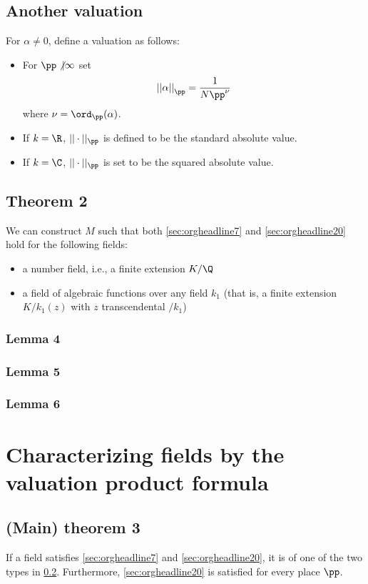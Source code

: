 \documentclass{article}
\begin{document}
\subsection{Another valuation}
\label{sec:orgheadline21}
For \(\alpha\neq 0\), define a valuation as follows:
\begin{itemize}
\item For \(\pp \not | \infty\) set
\[ { ||\alpha|| }_\pp = \frac1{ N\pp^\nu } \]
where \(\nu = \ord_\pp(\alpha)\).
\item If \(k=\R\), \(||\cdot||_\pp\) is defined to be the standard absolute value.
\item If \(k=\C\), \(||\cdot||_\pp\) is set to be the squared absolute value.
\end{itemize}
\subsection{Theorem 2}
\label{sec:orgheadline25}
We can construct \(M\) such that both \ref{sec:orgheadline7} and \ref{sec:orgheadline20} hold for the following fields:
\begin{itemize}
\item a number field, i.e., a finite extension \(K/\Q\)
\item a field of algebraic functions over any field \(k_1\) (that is, a finite extension \(K/k_1(z)\) with \(z\) transcendental \(/k_1\))
\end{itemize}
\subsubsection{Lemma 4}
\label{sec:orgheadline22}
\subsubsection{Lemma 5}
\label{sec:orgheadline23}
\subsubsection{Lemma 6}
\label{sec:orgheadline24}

\section{Characterizing fields by the valuation product formula}
\label{sec:orgheadline28}
\subsection{(Main) theorem 3}
\label{sec:orgheadline27}
If a field satisfies \ref{sec:orgheadline7} and \ref{sec:orgheadline20}, it is of one of the two types in \ref{sec:orgheadline25}. Furthermore, \ref{sec:orgheadline20} is satisfied for every place \(\pp\).
\end{document}
